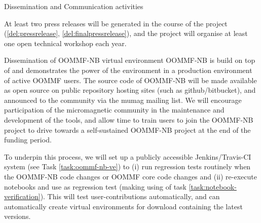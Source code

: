 \begin{Workpackage}{\thewpno}
\begin{task}{Dissemination and Communication activities}

  At least two press releases will be generated in the course of the
  project (\ref{del:pressrelease}, \ref{del:finalpressrelease}), and
  the project will organise at least one open technical workshop each
  year. %
\end{task}

\begin{WPDeliverables}
\end{WPDeliverables}


\begin{task}{Dissemination of OOMMF-NB virtual environment}
  \label{task:dissemination-of-oommf-nb-virtual-environment}
  OOMMF-NB is build on top of \TheProject and demonstrates the power
  of the environment in a production environment of active OOMMF users. 
  The source code of OOMMF-NB will be made available as open source on
  public repository hosting sites (such as github/bitbucket), and
  announced to the community via the mumag mailing list. We will
  encourage participation of the micromagnetic community in the
  maintenance and development of the tools, and allow time to train
  users to join the OOMMF-NB project to drive towards a self-sustained
  OOMMF-NB project at the end of the funding period.

  To underpin this process, we will set up a publicly accessible
  Jenkins/Travis-CI system (see Task \ref{task:oommf-nb-ve}) to (i) run regression tests routinely when
  the OOMMF-NB code changes or OOMMF core code changes and (ii)
  re-execute notebooks and use as regression test (making using of
  task \ref{task:notebook-verification}). This will test
  user-contributions automatically, and can automatically create
  virtual environments for download containing the latest versions.


\end{task}
\end{Workpackage}
